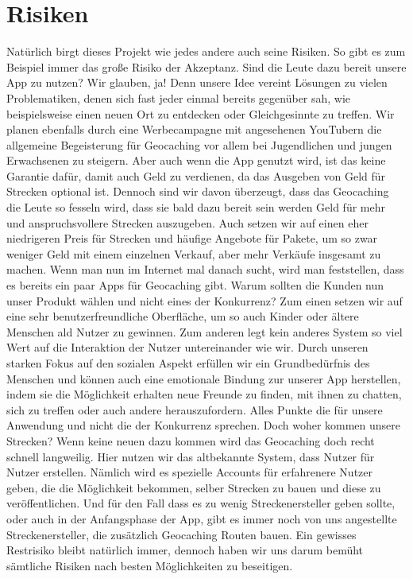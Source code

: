 \documentclass[a4paper, 12pt]{article}
\begin{document}
\section{Risiken}
Natürlich birgt dieses Projekt wie jedes andere auch seine Risiken.\newline
So gibt es zum Beispiel immer das große Risiko der Akzeptanz. Sind die Leute dazu bereit unsere App zu nutzen? Wir glauben, ja! Denn unsere Idee vereint Lösungen zu vielen Problematiken, denen sich fast jeder einmal bereits gegenüber sah, wie beispielsweise einen neuen Ort zu entdecken oder Gleichgesinnte zu treffen. Wir planen ebenfalls durch eine Werbecampagne mit angesehenen YouTubern die allgemeine Begeisterung für Geocaching vor allem bei Jugendlichen und jungen Erwachsenen zu steigern.\newline
Aber auch wenn die App genutzt wird, ist das keine Garantie dafür, damit auch Geld zu verdienen, da das Ausgeben von Geld für Strecken optional ist. Dennoch sind wir davon überzeugt, dass das Geocaching die Leute so fesseln wird, dass sie bald dazu bereit sein werden Geld für mehr und anspruchsvollere Strecken auszugeben. Auch setzen wir auf einen eher niedrigeren Preis für Strecken und häufige Angebote für Pakete, um so zwar weniger Geld mit einem einzelnen Verkauf, aber mehr Verkäufe insgesamt zu machen.\newline
Wenn man nun im Internet mal danach sucht, wird man feststellen, dass es bereits ein paar Apps für Geocaching gibt. Warum sollten die Kunden nun unser Produkt wählen und nicht eines der Konkurrenz? Zum einen setzen wir auf eine sehr benutzerfreundliche Oberfläche, um so auch Kinder oder ältere Menschen ald Nutzer zu gewinnen. Zum anderen legt kein anderes System so viel Wert auf die Interaktion der Nutzer untereinander wie wir. Durch unseren starken Fokus auf den sozialen Aspekt erfüllen wir ein Grundbedürfnis des Menschen und können auch eine emotionale Bindung zur unserer App herstellen, indem sie die Möglichkeit erhalten neue Freunde zu finden, mit ihnen zu chatten, sich zu treffen oder auch andere herauszufordern. Alles Punkte die für unsere Anwendung und nicht die der Konkurrenz sprechen.\newline
Doch woher kommen unsere Strecken? Wenn keine neuen dazu kommen wird das Geocaching doch recht schnell langweilig. Hier nutzen wir das altbekannte System, dass Nutzer für Nutzer erstellen. Nämlich wird es spezielle Accounts für erfahrenere Nutzer geben, die die Möglichkeit bekommen, selber Strecken zu bauen und diese zu veröffentlichen. Und für den Fall dass es zu wenig Streckenersteller geben sollte, oder auch in der Anfangsphase der App, gibt es immer noch von uns angestellte Streckenersteller, die zusätzlich Geocaching Routen bauen.\newline
Ein gewisses Restrisiko bleibt natürlich immer, dennoch haben wir uns darum bemüht sämtliche Risiken nach besten Möglichkeiten zu beseitigen.
\end{document}
